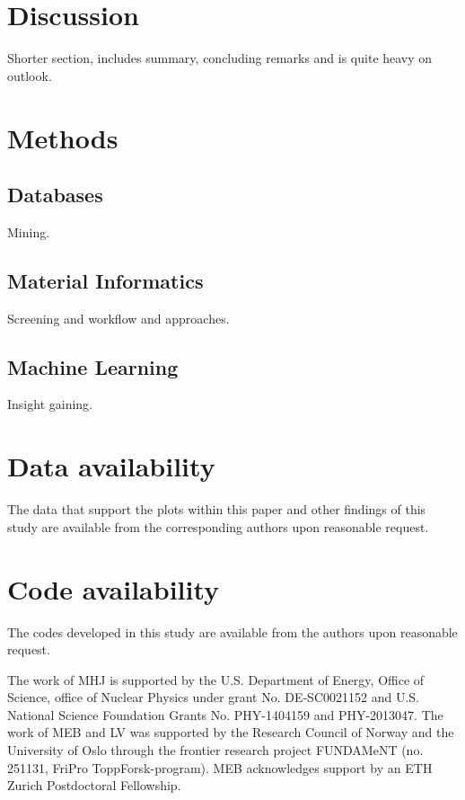 \documentclass[superscriptaddress,unsortedaddress,
 amsmath,amssymb,
 aps,
]{revtex4-2}
\begin{document}
\section*{Discussion} %
Shorter section, includes summary, concluding remarks and is quite heavy on outlook.  

\section*{Methods}

\subsection*{Databases} %
Mining.  

\subsection*{Material Informatics} %
Screening and workflow and approaches.  

\subsection*{Machine Learning} %
Insight gaining. 

\section*{Data availability} 
The data that support the plots within this paper and other findings of this study are
available from the corresponding authors upon reasonable request.

\section*{Code availability} 
The codes developed in this study are available from the authors upon reasonable
request.


\begin{acknowledgments}

The work of MHJ is supported by the U.S. Department of Energy,
Office of Science, office of Nuclear Physics under grant
No. DE-SC0021152 and U.S. National Science Foundation Grants
No. PHY-1404159 and PHY-2013047. 
The work of MEB and LV was supported by the Research Council of Norway and the University of Oslo through the frontier research project FUNDAMeNT (no. 251131, FriPro ToppForsk-program). 
MEB acknowledges support by an ETH Zurich Postdoctoral Fellowship. 

\end{acknowledgments}
\end{document}
